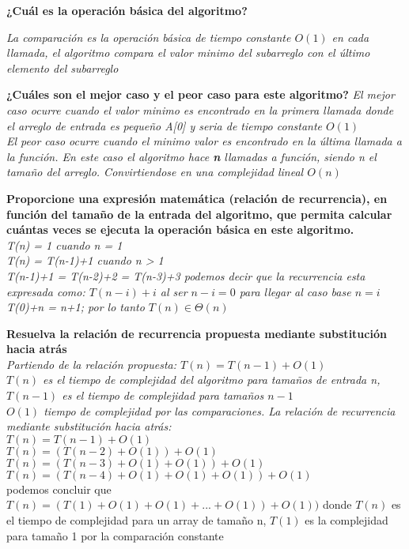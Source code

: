 \documentclass{article}
\begin{document}
\begin{question}
  \textbf{¿Cuál es la operación básica del algoritmo?}
  
  \textit{La comparación es la operación básica de tiempo constante $O(1)$ en cada llamada, el algoritmo compara el valor minimo del subarreglo con el último elemento del subarreglo}
    
\end{question}
\begin{question}
  \textbf{¿Cuáles son el mejor caso y el peor caso para este algoritmo?}
  \textit{El mejor caso ocurre cuando el valor minimo es encontrado en la primera llamada donde el arreglo de entrada es pequeño A[0] y seria de tiempo constante $O(1)$}\\
  \textit{El peor caso ocurre cuando el minimo valor es encontrado en la última llamada a la función. En este caso el algoritmo hace \textbf{n} llamadas a función, siendo n el tamaño del arreglo. Convirtiendose en una complejidad lineal $O(n)$}
    
\end{question}
\begin{question}
  \textbf{Proporcione una expresión matemática (relación de recurrencia), en función del tamaño de la entrada del algoritmo, que permita calcular cuántas veces se ejecuta la operación básica en este algoritmo.}\\
  \textit{T(n) = 1 cuando n = 1}\\
  \textit{T(n) = T(n-1)+1 cuando n > 1}\\
  \textit{T(n-1)+1 = T(n-2)+2 = T(n-3)+3 podemos decir que la recurrencia esta expresada como: $T(n-i)+i$ al ser $n-i=0$ para llegar al caso base $n=i$}\\
  \textit{T(0)+n = n+1; por lo tanto $T(n) \in \Theta(n)$ }
\end{question}
\begin{question}
  \textbf{Resuelva la relación de recurrencia propuesta mediante substitución hacia atrás}\\
  \textit{Partiendo de la relación propuesta: $T(n) = T(n-1)+O(1)$}\\
  \textit{$T(n)$ es el tiempo de complejidad del algoritmo para tamaños de entrada n, $T(n-1)$ es el tiempo de complejidad para tamaños $n-1$ }\\
  \textit{$O(1)$ tiempo de complejidad por las comparaciones. La relación de recurrencia mediante substitución hacia atrás:}\\
  $T(n)=T(n-1)+O(1)$\\
  $T(n)=(T(n-2)+O(1))+O(1)$\\
  $T(n)=(T(n-3)+O(1)+O(1))+O(1)$\\
  $T(n)=(T(n-4)+O(1)+O(1)+O(1))+O(1)$\\
  podemos concluir que $T(n) = (T(1)+O(1)+O(1)+...+O(1))+O(1))$ donde $T(n)$ es el tiempo de complejidad para un array de tamaño n, $T(1)$ es la complejidad para tamaño 1 por la comparación constante
\end{question}
\end{document}

